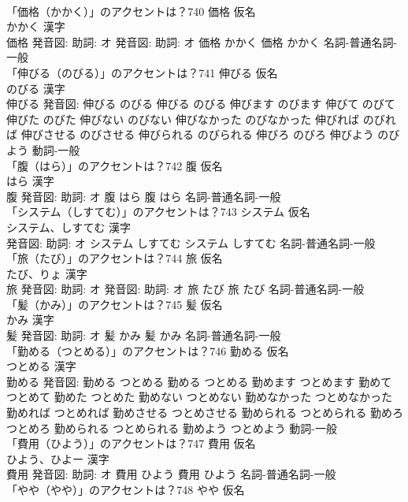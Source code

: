 \documentclass[8pt]{extreport}
\begin{document}
\begin{CJK}{UTF8}{min}
\\	「価格（かかく）」のアクセントは？740	価格 仮名　
\\	かかく 漢字　
\\	価格 発音図: 助詞: オ 発音図: 助詞: オ	価格 かかく		価格 かかく				名詞-普通名詞-一般 
\\	「伸びる（のびる）」のアクセントは？741	伸びる 仮名　
\\	のびる 漢字　
\\	伸びる 発音図:	伸びる のびる		伸びる のびる 伸びます のびます 伸びて のびて 伸びた のびた 伸びない のびない 伸びなかった のびなかった 伸びれば のびれば 伸びさせる のびさせる 伸びられる のびられる 伸びろ のびろ 伸びよう のびよう				動詞-一般 
\\	「腹（はら）」のアクセントは？742	腹 仮名　
\\	はら 漢字　
\\	腹 発音図: 助詞: オ	腹 はら		腹 はら				名詞-普通名詞-一般 
\\	「システム（しすてむ）」のアクセントは？743	システム 仮名　
\\	システム、しすてむ 漢字　
\\	発音図: 助詞: オ	システム しすてむ		システム しすてむ				名詞-普通名詞-一般 
\\	「旅（たび）」のアクセントは？744	旅 仮名　
\\	たび、りょ 漢字　
\\	旅 発音図: 助詞: オ 発音図: 助詞: オ	旅 たび		旅 たび				名詞-普通名詞-一般 
\\	「髪（かみ）」のアクセントは？745	髪 仮名　
\\	かみ 漢字　
\\	髪 発音図: 助詞: オ	髪 かみ		髪 かみ				名詞-普通名詞-一般 
\\	「勤める（つとめる）」のアクセントは？746	勤める 仮名　
\\	つとめる 漢字　
\\	勤める 発音図:	勤める つとめる		勤める つとめる 勤めます つとめます 勤めて つとめて 勤めた つとめた 勤めない つとめない 勤めなかった つとめなかった 勤めれば つとめれば 勤めさせる つとめさせる 勤められる つとめられる 勤めろ つとめろ 勤められる つとめられる 勤めよう つとめよう				動詞-一般 
\\	「費用（ひよう）」のアクセントは？747	費用 仮名　
\\	ひよう、ひよー 漢字　
\\	費用 発音図: 助詞: オ	費用 ひよう		費用 ひよう				名詞-普通名詞-一般 
\\	「やや（やや）」のアクセントは？748	やや 仮名　

\end{CJK}
\end{document}
